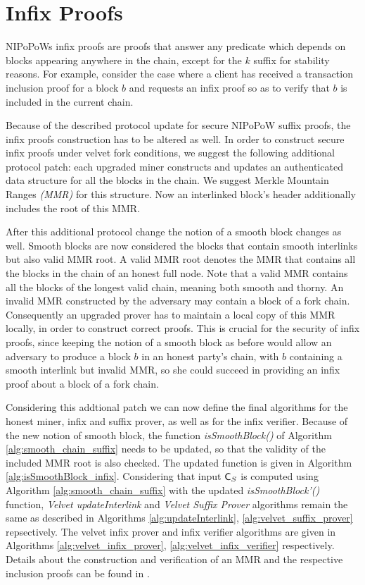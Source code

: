 \section{Infix Proofs}\label{sec:infix}
NIPoPoWs infix proofs are proofs that answer any predicate which depends on blocks appearing anywhere in the chain, except for the $k$ suffix for stability reasons. For example, consider the case where a client has received a transaction inclusion proof for a block $b$ and requests an infix proof so as to verify that $b$ is included in the current chain.

Because of the described protocol update for secure NIPoPoW suffix proofs, the infix proofs construction has to be altered as well. In order to construct secure infix proofs under velvet fork conditions, we suggest the following additional protocol patch: each upgraded miner constructs and updates an authenticated data structure for all the blocks in the chain. We suggest Merkle Mountain Ranges \emph{(MMR)} for this structure. Now an interlinked block's header additionally includes the root of this MMR. 

After this additional protocol change the notion of a smooth block changes as well. Smooth blocks are now considered the blocks that contain smooth interlinks but also valid MMR root. A valid MMR root denotes the MMR that contains all the blocks in the chain of an honest full node. Note that a valid MMR contains all the blocks of the longest valid chain, meaning both smooth and thorny. An invalid MMR constructed by the adversary may contain a block of a fork chain. Consequently an upgraded prover has to maintain a local copy of this MMR locally, in order to construct correct proofs. This is crucial for the security of infix proofs, since keeping the notion of a smooth block as before would allow an adversary to produce a block $b$ in an honest party's chain, with $b$ containing a smooth interlink but invalid MMR, so she could succeed in providing an infix proof about a block of a fork chain.

Considering this addtional patch we can now define the final algorithms for the honest miner, infix and suffix prover, as well as for the infix verifier. Because of the new notion of smooth block, the function \textit{isSmoothBlock()} of Algorithm \ref{alg:smooth_chain_suffix} needs to be updated, so that the validity of the included MMR root is also checked. The updated function is given in Algorithm \ref{alg:isSmoothBlock_infix}. Considering that input $\mathsf{C}_S$ is computed using Algorithm \ref{alg:smooth_chain_suffix} with the updated \textit{isSmoothBlock'()} function, \emph{Velvet updateInterlink} and \emph{Velvet Suffix Prover} algorithms remain the same as described in Algorithms \ref{alg:updateInterlink}, \ref{alg:velvet_suffix_prover} repsectively. The velvet infix prover and infix verifier algorithms are given in Algorithms \ref{alg:velvet_infix_prover}, \ref{alg:velvet_infix_verifier} respectively. Details about the construction and verification of an MMR and the respective inclusion proofs can be found in \cite{ct}.

